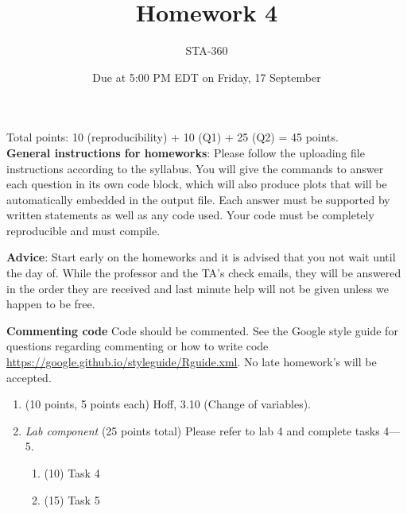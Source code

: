 \documentclass{article}
\begin{document}
\title{Homework 4}
\author{STA-360}
\date{Due at 5:00 PM EDT on Friday, 17 September}
\maketitle

Total points: 10 (reproducibility) + 10 (Q1) + 25 (Q2) = 45 points. \\

\textbf{General instructions for homeworks}: Please follow the uploading file instructions according to the syllabus. You will give the commands to answer each question in its own code block, which will also produce plots that will be automatically embedded in the output file. Each answer must be supported by written statements as well as any code used. Your code must be completely reproducible and must compile. 

\textbf{Advice}: Start early on the homeworks and it is advised that you not wait until the day of. While the professor and the TA's check emails, they will be answered in the order they are received and last minute help will not be given unless we happen to be free.  

\textbf{Commenting code}
Code should be commented. See the Google style guide for questions regarding commenting or how to write 
code \url{https://google.github.io/styleguide/Rguide.xml}. No late homework's will be accepted.


\begin{enumerate}
\item (10 points, 5 points each) Hoff, 3.10 (Change of variables). 


\item {\em Lab component} 
  (25 points total) Please refer to lab 4 and complete tasks 4---5. 
  \begin{enumerate}
  \item (10) Task 4
  \item (15) Task 5
  \end{enumerate}
  
\end{enumerate}
\end{document}
